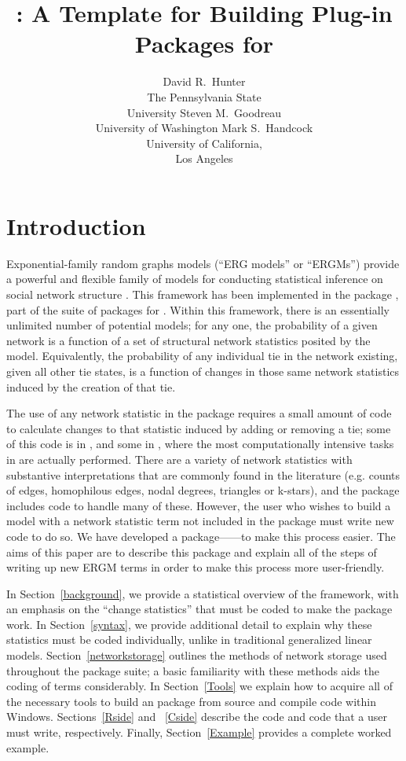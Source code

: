 \documentclass[nojss]{jss}
\title{\pkg{ergm.userterms}: A Template for Building Plug-in Packages for
\pkg{statnet}}
\author{
  David R.\ Hunter \\ The Pennsylvania State\\University \And
  Steven M.\ Goodreau \\ University of Washington \And
  Mark S.\ Handcock \\ University of California,\\Los Angeles
}
\begin{document}
\section{Introduction}
\label{introduction}

Exponential-family random graphs models (``ERG models'' or ``ERGMs'') provide a
powerful and flexible family of models for conducting statistical inference on
social network structure \citep{fra86, statnetjss,ergmjss, statnettutorialjss}.
This framework has been implemented in the  package \citep{ergmjss},
part of the  suite of packages \citep{statnetjss} for 
\citep{r2010}. Within this framework, there is an essentially unlimited number
of potential models; for any one, the probability of a given network is a
function of a set of structural network statistics posited by the model.
Equivalently, the probability of any individual tie in the network existing,
given all other tie states, is a function of changes in those same network
statistics induced by the creation of that tie.

The use of any network statistic in the  package requires a small
amount of code to calculate changes to that statistic induced by adding or
removing a tie; some of this code is in , and some in ,
where the most computationally intensive tasks in  are actually
performed. There are a variety of network statistics with substantive
interpretations that are commonly found in the literature (e.g. counts of edges,
homophilous edges, nodal degrees, triangles or k-stars), and the 
package includes code to handle many of these. However, the user who wishes to
build a model with a network statistic term not included in the  package 
must write new code to do so. We have developed a 
package------to make this process easier. 
The aims of this paper are
to describe this package and explain all of the steps of writing up new ERGM
terms in order to make this process more user-friendly.

In Section~\ref{background}, we provide a statistical overview of the 
framework, with an emphasis on the ``change statistics'' that must be coded to
make the  package work. In Section~\ref{syntax}, we provide additional
detail to explain why these statistics must be coded individually, unlike in
traditional generalized linear models. Section~\ref{networkstorage} outlines the
methods of network storage used throughout the  package suite; a
basic familiarity with these methods aids the coding of  terms
considerably. In Section~\ref{Tools} we explain how to acquire all of the
necessary tools to build an  package from source and compile
 code within Windows. Sections~\ref{Rside} and ~\ref{Cside} describe
the  code and  code that a user must write,
respectively. Finally, Section~\ref{Example} provides a complete worked example.
\end{document}
